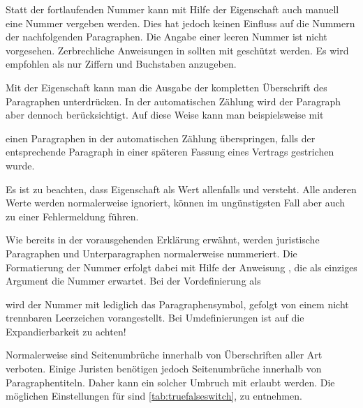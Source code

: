 Statt der fortlaufenden Nummer kann mit Hilfe der Eigenschaft
 auch manuell eine Nummer vergeben
werden. Dies hat jedoch keinen Einfluss auf die Nummern der nachfolgenden
Paragraphen. Die Angabe einer leeren Nummer ist nicht
vorgesehen. Zerbrechliche Anweisungen in  sollten mit
 geschützt werden. Es wird empfohlen als
 nur Ziffern und Buchstaben anzugeben.

Mit der Eigenschaft  kann man die
Ausgabe der kompletten Überschrift des Paragraphen unterdrücken. In der
automatischen Zählung wird der Paragraph aber dennoch berücksichtigt. Auf
diese Weise kann man beispielsweise mit
\begin{lstcode}
\end{lstcode}
einen Paragraphen in der automatischen Zählung überspringen, falls der
entsprechende Paragraph in einer späteren Fassung eines Vertrags gestrichen
wurde.

Es ist zu beachten, dass Eigenschaft  als
Wert allenfalls  und  versteht. Alle anderen Werte
werden normalerweise ignoriert, können im ungünstigsten Fall aber auch zu
einer Fehlermeldung führen.%
\EndIndexGroup


\begin{Declaration}
\end{Declaration}
Wie bereits in der vorausgehenden Erklärung erwähnt, werden juristische
Paragraphen und Unterparagraphen normalerweise nummeriert. Die Formatierung
der Nummer erfolgt dabei mit Hilfe der Anweisung , die als
einziges Argument die Nummer erwartet. Bei der
Vordefinierung als
\begin{lstcode}
  \newcommand*{\Clauseformat}[1]{\S~#1}
\end{lstcode}
wird der Nummer mit  lediglich das Paragraphensymbol,
gefolgt von einem nicht trennbaren Leerzeichen
vorangestellt. Bei  Umdefinierungen ist auf die
Expandierbarkeit zu achten!%
\EndIndexGroup


\begin{Declaration}
\end{Declaration}%
Normalerweise sind Seitenumbrüche innerhalb von Überschriften aller Art
verboten. Einige Juristen benötigen jedoch Seitenumbrüche innerhalb von
Paragraphentiteln. Daher kann ein solcher Umbruch mit
 erlaubt
werden. Die möglichen Einstellungen für  sind
\autoref{tab:truefalseswitch},  zu
entnehmen.%
\EndIndexGroup

